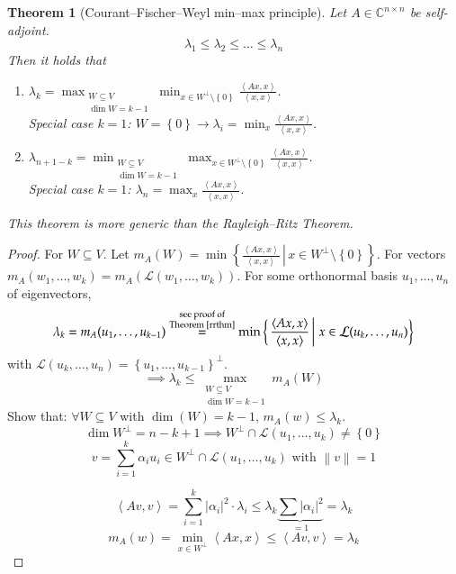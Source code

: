 \documentclass[a4paper]{article}
\newcounter{lecref}[section]
\numberwithin{lecref}{section}
\newtheorem{theorem}[lecref]{Theorem}
\newcommand{\set}[1]{\left\{#1\right\}}
\newcommand{\setdef}[2]{\left\{\left.#1\,\right|\,#2\right\}}
\newcommand{\angel}[1]{\left\langle#1\right\rangle}
\newcommand{\norm}[1]{\left\|#1\right\|}
\newcommand{\card}[1]{\left|#1\right|}
\begin{document}
\begin{theorem}[Courant--Fischer--Weyl min--max principle] %
  \label{cfw-mm}
  Let $A \in \mathbb C^{n \times n}$ be self-adjoint.
  \[ \lambda_1 \leq \lambda_2 \leq \dots \leq \lambda_n \]
  Then it holds that
  \begin{enumerate}
    \item $\lambda_k = \max_{\substack{W \subseteq V \\ \dim{W} = k - 1}} \min_{x \in W^\bot \setminus \set{0}} \frac{\angel{Ax, x}}{\angel{x, x}}$. \\
    Special case $k = 1$: $W = \set{0} \to \lambda_i = \min_x \frac{\angel{Ax, x}}{\angel{x, x}}$.
    \item $\lambda_{n+1 - k} = \min_{\substack{W \subseteq V \\ \dim{W} = k-1}} \max_{x \in W^\bot \setminus \set{0}} \frac{\angel{Ax, x}}{\angel{x, x}}$. \\
    Special case $k = 1$: $\lambda_n = \max_x \frac{\angel{Ax, x}}{\angel{x, x}}$.
  \end{enumerate}
  This theorem is more generic than the Rayleigh--Ritz Theorem.
\end{theorem}

\begin{proof}
  For $W \subseteq V$.
  Let $m_A(W) = \min\setdef{\frac{\angel{Ax, x}}{\angel{x, x}}}{x \in W^\bot \setminus \set{0}}$.
  For vectors $m_A(w_1, \dots, w_k) = m_A(\mathcal L(w_1, \dots, w_k))$.
  For some orthonormal basis $u_1, \dots, u_n$ of eigenvectors,
  \[ \lambda_k = m_A(u_1, \dots, u_{k-1}) \overset{\substack{\text{see proof of} \\ \text{Theorem~\ref{rrthm}}}}{=} \min \setdef{\frac{\angel{Ax, x}}{\angel{x, x}}}{x \in \mathcal L(u_k, \dots, u_n)} \]
  with $\mathcal L(u_k, \dots, u_n) = \set{u_1, \dots, u_{k-1}}^\bot$.
  \[ \implies \lambda_k \leq \max_{\substack{W \subseteq V \\ \dim{W} = k - 1}} m_A(W) \]
  Show that: $\forall W \subseteq V$ with $\dim(W) = k-1$, $m_A(w) \leq \lambda_k$.
  \[ \dim{W^{\bot}} = n - k + 1 \implies W^\bot \cap \mathcal L(u_1, \dots, u_k) \neq \set{0} \]
  \[ v = \sum_{i=1}^k \alpha_i u_i \in W^\bot \cap \mathcal L(u_1, \dots, u_k) \text{ with } \norm{v} = 1 \]

  \[ \angel{Av, v} = \sum_{i=1}^k \card{\alpha_i}^2 \cdot \lambda_i \leq \lambda_k \underbrace{\sum \card{\alpha_i}^2}_{=1} = \lambda_k \]
  \[ m_A(w) = \min_{x \in W^\bot} \angel{Ax, x} \leq \angel{Av, v} = \lambda_k \]
\end{proof}
\end{document}
